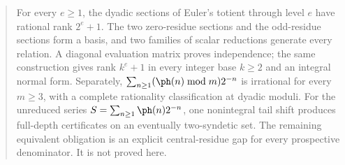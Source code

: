\begin{abstract}
For every $e\ge1$, the dyadic sections of Euler's totient through level $e$
have rational rank $2^e+1$. The two zero-residue sections and the odd-residue
sections form a basis, and two families of scalar reductions generate every relation.
A diagonal evaluation matrix proves independence; the same construction gives
rank $k^e+1$ in every integer base $k\ge2$ and an integral normal form.
Separately, $\sum_{n\ge1}(\ph(n)\bmod m)2^{-n}$ is irrational for every
$m\ge3$, with a complete rationality classification at dyadic moduli.
For the unreduced series $S=\sum_{n\ge1}\ph(n)2^{-n}$, one nonintegral tail
shift produces full-depth certificates on an eventually two-syndetic set.
The remaining equivalent obligation is an explicit central-residue gap for
every prospective denominator. It is not proved here.
\end{abstract}
